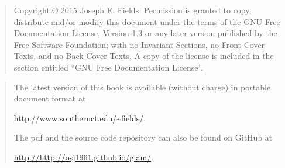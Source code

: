 \rule{0pt}{0pt}

\vfill

\begin{quote}
    Copyright \copyright{}  2015  Joseph E. Fields.
    Permission is granted to copy, distribute and/or modify this document
    under the terms of the GNU Free Documentation License, Version 1.3
    or any later version published by the Free Software Foundation;
    with no Invariant Sections, no Front-Cover Texts, and no Back-Cover Texts.
    A copy of the license is included in the section entitled ``GNU
    Free Documentation License''.
\end{quote}

\vfill

\begin{quote}
The latest version of this book is available (without charge) in portable document format at \newline
\rule{0pt}{0pt} \hspace{1in} \url{http://www.southernct.edu/~fields/}.  

\noindent The pdf and the source code repository can also be found on GitHub at \newline
\rule{0pt}{0pt} \hspace{1in} \url{http://http://osj1961.github.io/giam/}.  


\end{quote}

\vfill
